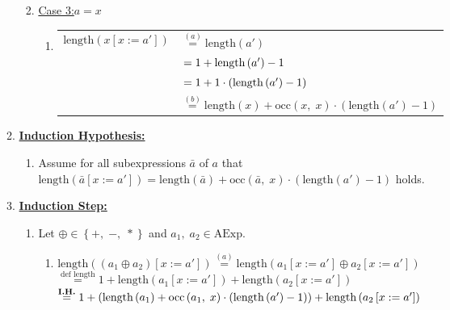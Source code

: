 \documentclass[12pt]{scrartcl}
\begin{document}
\begin{enumerate}
\begin{enumerate}
\begin{enumerate}
\begin{enumerate}
\begin{tabular}{ll}
					\end{tabular}
				\end{enumerate}
				\item[] \underline{Case 3:}\quad $a=x$
				\begin{enumerate}
					\item[]
					\begin{tabular}{ll}
						$\text{length}\left(x\left[x:=a'\right]\right)$ 
						  & $\overset{\left(a\right)}{=}\text{length}\left(a'\right)$\\
						  & $\hspace*{1.75pt}=1+\text{length}\left(a'\right)-1$\\
						  & $\hspace*{1.75pt}=1+1\cdot\left(\text{length}\left(a'\right)-1\right)$\\
						  & $\overset{\left(b\right)}{=}\text{length}\left(x\right)+\text{occ}\left(x,\;x\right)\cdot\left(\text{length}\left(a'\right)-1\right)$\\
					\end{tabular}
				\end{enumerate}
			\end{enumerate}
			\item[] \underline{\textbf{Induction Hypothesis:}}
			\begin{enumerate}
				\item[] Assume for all subexpressions $\bar{a}$ of $a$ that\\
				$\text{length}\left(\bar{a}\left[x:=a'\right]\right)=\text{length}\left(\bar{a}\right)+\text{occ}\left(\bar{a},\;x\right)\cdot\left(\text{length}\left(a'\right)-1\right)$ holds.
			\end{enumerate}
			\item[] \underline{\textbf{Induction Step:}}
			\begin{enumerate}
				\item[] Let $\oplus\in\left\{+,\;-,\;*\right\}$ and $a_{1},\;a_{2}\in\text{AExp}$.
				\begin{enumerate}
					\item[] $\text{length}\left(\left(a_{1}\oplus a_{2}\right)\left[x:=a'\right]\right)\overset{\left(a\right)}{=}\text{length}\left(a_{1}\left[x:=a'\right]\oplus a_{2}\left[x:=a'\right]\right)$\\[6pt]
					$\overset{\text{def length}}{=}1+\text{length}\left(a_{1}\left[x:=a'\right]\right)+ \text{length}\left(a_{2}\left[x:=a'\right]\right)$\\[6pt]
					$\overset{\text{\textbf{I.H.}}}{=}1+\left(\text{length}\left(a_{1}\right)+\text{occ}\left(a_{1},\;x\right)\cdot\left(\text{length}\left(a'\right)-1\right)\right)+ \text{length}\left(a_{2}\left[x:=a'\right]\right)$\\[6pt]

\end{enumerate}
\end{enumerate}
\end{enumerate}
\end{enumerate}
\end{document}
